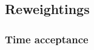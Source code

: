 
\subsection{Reweightings}



\begin{frame}
  \frametitle{Time acceptance}
  \vspace*{-0.2cm}
    
\end{frame}





